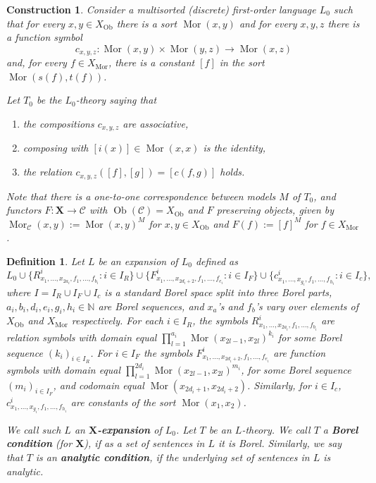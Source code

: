 \documentclass[12pt]{amsart}
\newtheorem{definition}[theorem]{Definition}
\newtheorem{construction}[theorem]{Construction}
\DeclareMathOperator{\Mor}{Mor}
\DeclareMathOperator{\Ob}{Ob}
\begin{document}
\begin{construction} \label{construction: describing L_0 depending on X}
    Consider a multisorted (discrete) first-order language $L_0$ such that for every $x,y \in X_{\Ob}$ there is a sort $\Mor(x,y)$ and for every $x,y,z$ there is a function symbol
    \[ c_{x,y,z}:\Mor(x,y) \times \Mor(y,z) \to \Mor(x,z) \]
    and, for every $f \in X_{\Mor}$, there is a constant $[f]$ in the sort $\Mor(s(f),t(f))$.

    Let $T_0$ be the $L_0$-theory saying that
    \begin{enumerate}
        \item the compositions $c_{x,y,z}$ are associative,
        \item composing with $[i(x)] \in \Mor(x,x)$ is the identity,
        \item the relation $c_{x,y,z}([f],[g]) = [c(f,g)]$ holds.
    \end{enumerate}
    Note that there is a one-to-one correspondence between models $M$ of $T_0$, and functors $F:\mathbf{X}\to\mathcal{C}$ with $\Ob(\mathcal{C})=X_{\Ob}$ and $F$ preserving objects, given by $\Mor_\mathcal{C}(x,y):=\Mor(x,y)^M$ for $x,y\in X_{\Ob}$ and $F(f):=[f]^M$ for $f\in X_{\Mor}$.
\end{construction}

\begin{definition} \label{definition: X-expansions}
    Let $L$ be an expansion of $L_0$ defined as 
    \[ 
    L_0 \cup \{ R_{x_1, \dots, x_{2a_i}, f_1, \dots, f_{b_i}}^i : i \in I_R\} \cup \{ F_{x_1, \dots, x_{2d_i+2}, f_1, \dots, f_{e_i}}^i : i \in I_F\} \cup \{ c_{x_1, \dots, x_{g_i}, f_1, \dots, f_{h_i}}^i : i \in I_c\},
    \]
    where $I = I_R \cup I_F \cup I_c$ is a standard Borel space split into three Borel parts, $a_i, b_i, d_i,e_i, g_i,h_i \in \mathbb{N}$ are Borel sequences, and $x_a$'s and $f_b$'s vary over elements of $X_{\Ob}$ and $X_{\Mor}$ respectively.
    For each $i \in I_R$, the symbols $R_{x_1, \dots, x_{2a_i}, f_1, \dots, f_{b_i}}^i$ are relation symbols with domain equal $\prod_{l=1}^{a_i} \Mor(x_{2l-1}, x_{2l})^{k_i}$ for some Borel sequence $(k_i)_{i \in I_R}$. For $i \in I_F$ the symbols $F_{x_1, \dots, x_{2d_i+2}, f_1, \dots, f_{e_i}}^i$ are function symbols with domain equal $\prod_{l=1}^{2d_i} \Mor(x_{2l-1}, x_{2l})^{m_i}$, for some Borel sequence $(m_i)_{i \in I_F}$, and codomain equal $\Mor(x_{2d_i+1}, x_{2d_i+2})$. 
    Similarly, for $i \in I_c$,  $c_{x_1, \dots, x_{g_i}, f_1, \dots, f_{h_i}}^i$ are constants of the sort $\Mor(x_1, x_2)$.
    
    We call such $L$ an $\mathbf{X}$\textbf{-expansion} of $L_0$.
    Let $T$ be an $L$-theory. We call $T$ a \textbf{Borel condition} (for $\mathbf{X}$), if as a set of sentences in $L$ it is Borel. Similarly, we say that $T$ is an \textbf{analytic condition}, if the underlying set of sentences in $L$ is analytic.
\end{definition}
\end{document}

